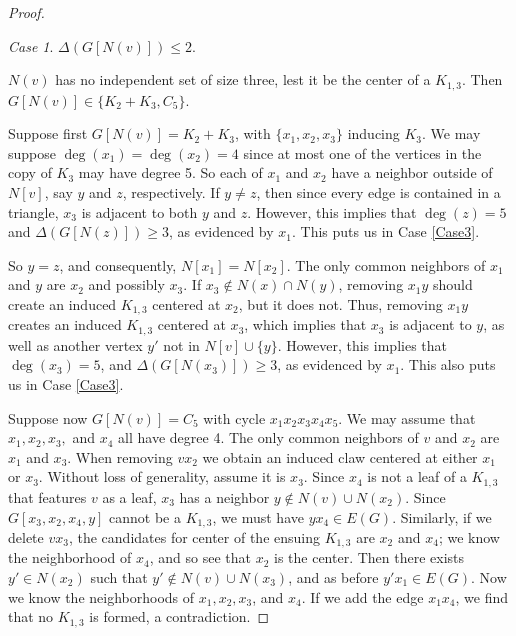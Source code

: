 \documentclass[12pt]{amsart}
\theoremstyle{plain}
\theoremstyle{definition}
\theoremstyle{remark}
\newtheorem{case}{Case}[thm]
\newcommand{\claw}{\ensuremath{K_{1,3}}\xspace}
\begin{document}
{\begin{proof}
\begin{case} $\Delta(G[N(v)])\leq 2$. \end{case}
$N(v)$ has no independent set of size three, lest it be the center of a \claw.
Then $G[N(v)] \in \{K_2 + K_3,C_5\}$.

Suppose first $G[N(v)]=K_2 + K_3$, with $\{x_1,x_2,x_3\}$ inducing $K_3$.
We may suppose $\deg(x_1)=\deg(x_2)=4$ since at most one of the vertices in the copy of $K_3$ may have degree 5. So each of $x_1$ and $x_2$ have a neighbor outside of $N[v]$, say $y$ and $z$, respectively.  If $y \neq z$, then since every edge is contained in a triangle, $x_3$ is adjacent to both $y$ and $z$.  However, this implies that $\deg(z) = 5$ and $\Delta(G[N(z)]) \ge 3$, as evidenced by $x_1$.  This puts us in Case \ref{Case3}.

So $y = z$, and consequently, $N[x_1] = N[x_2]$.   The only common neighbors of $x_1$ and $y$ are $x_2$ and possibly $x_3$. If $x_3\notin N(x)\cap N(y)$, removing $x_1y$ should create an induced \claw centered at $x_2$, but it does not.  Thus, removing $x_1y$ creates an induced \claw centered at $x_3$, which implies that $x_3$ is adjacent to $y$, as well as another vertex $y'$ not in $N[v] \cup \{y\}$.  However, this implies that $\deg(x_3)=5$, and $\Delta(G[N(x_3)]) \geq 3$, as evidenced by $x_1$.  This also puts us in Case \ref{Case3}.


Suppose now $G[N(v)]=C_5$ with cycle $x_1x_2x_3x_4x_5$.
We may assume that $x_1,x_2,x_3,$ and $x_4$ all have degree 4.
The only common neighbors of $v$ and $x_2$ are $x_1$ and $x_3$.  When removing $vx_2$ we obtain an induced claw centered at either $x_1$ or $x_3$.  Without loss of generality, assume it is $x_3$.  Since $x_4$ is not a leaf of a \claw that  features $v$ as a leaf, $x_3$ has a neighbor $y \not\in N(v) \cup N(x_2)$. Since $G[x_3,x_2,x_4,y]$ cannot be a \claw, we must have $yx_4 \in E(G)$. Similarly, if we delete $vx_3$, the candidates for center of the ensuing \claw are $x_2$ and $x_4$; we know the neighborhood of $x_4$, and so see that $x_2$ is the center. Then there exists $y' \in N(x_2)$ such that $y' \not\in N(v) \cup N(x_3)$, and as before $y'x_1 \in E(G)$. Now we know the neighborhoods of $x_1,x_2,x_3$, and $x_4$. If we add the edge $x_1x_4$, we find that no \claw is formed, a contradiction.
\end{proof}

}
\end{document}
